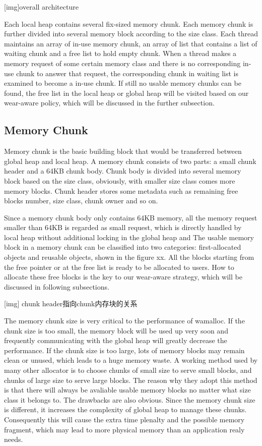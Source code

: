 \documentclass{vldb}
\begin{document}
[img]overall architecture

Each local heap contains several fix-sized memory chunk. Each memory chunk is further divided into several memory block according to the size class. Each thread maintains an array of in-use memory chunk, an array of list that contains a list of waiting chunk and a free list to hold empty chunk. When a thread makes a memory request of some certain memory class and there is no corresponding in-use chunk to answer that request, the corresponding chunk in waiting list is examined to become a in-use chunk. If still no usable memory chunks can be found, the free list in the local heap or global heap will be visited based on our wear-aware policy, which will be discussed in the further subsection.

\subsection{Memory Chunk}

Memory chunk is the basic building block that would be transferred between global heap and local heap. A memory chunk consists of two parts: a small chunk header and a 64KB chunk body. Chunk body is divided into several memory block based on the size class, obviously, with smaller size class comes more memory blocks. Chunk header stores some metadata such as remaining free blocks number, size class, chunk owner and so on.

Since a memory chunk body only contains 64KB memory, all the memory request smaller than 64KB is regarded as small request,
which is directly handled by local heap without additional locking in the global heap and 
The usable memory block in a memory chunk can be classified into two categories: first-allocated objects and reusable objects,
shown in the figure xx. 
All the blocks starting from the free pointer or at the free list is ready to be allocated to users.
How to allocate these free blocks is the key to our wear-aware strategy, which will be discussed in following subsections.

[img] chunk header指向chunk内存块的关系

The memory chunk size is very critical to the performance of wamalloc. 
If the chunk size is too small, the memory block will be used up very soon and frequently communicating with the global heap will greatly decrease the performance.
If the chunk size is too large, lots of memory blocks may remain clean or unused, which leads to a huge memory waste. 
A working method used by many other allocator is to choose chunks of small size to serve small blocks, and chunks of large size to serve large blocks.
The reason why they adopt this method is that there will always be avaliable usable memory blocks no matter what size class it belongs to.
The drawbacks are also obvious.
Since the memory chunk size is different, it increases the complexity of global heap to manage these chunks.
Consequently this will cause the extra time plenalty and the possible memory fragment, which may lead to more physical memory than an application realy needs.
\end{document}
